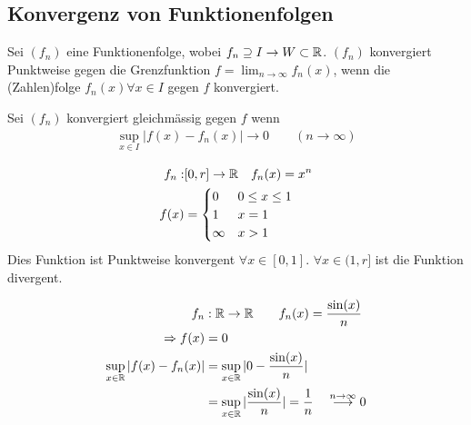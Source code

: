 \documentclass[a4paper]{article}
\begin{document}
	\subsection{Konvergenz von Funktionenfolgen}
	\begin{multicols}{2}
		\begin{fdef}
			Sei $(f_n)$  eine Funktionenfolge, wobei $f_n \supseteq I \rightarrow W \subset \mathbb{R}$. $(f_n)$ konvergiert Punktweise gegen die Grenzfunktion $f = \lim_{n \rightarrow \infty} f_n(x)$, wenn die (Zahlen)folge $f_n(x) \forall x \in I$ gegen $f$ konvergiert. 
		\end{fdef}
		\begin{fdef}
			Sei $(f_n)$ konvergiert gleichmässig gegen $f$ wenn
			\begin{align*}
				\sup_{x \in I} | f(x) - f_n(x) | \rightarrow 0 \qquad (n \rightarrow \infty)
			\end{align*}
		\end{fdef}
	\end{multicols}
	\begin{multicols}{2}
		\begin{fmerke}	
			\begin{align*}
				f_n: &[0,r] \rightarrow \mathbb{R} \quad f_n(x) = x^n \\
				f(x) &= \begin{cases}			
				        	0		& 0 \leq x \leq 1 \\
				        	1		& x = 1 \\
				         	\infty 	& x > 1
				        \end{cases}
			\end{align*}
			Dies Funktion ist Punktweise konvergent $\forall x \in [0,1]$. $\forall x \in (1,r]$ ist die Funktion divergent.
		\end{fmerke}
		

		\begin{fmerke}
			\begin{align*}
				f_n&: \mathbb{R} \rightarrow \mathbb{R} \qquad f_n(x) = \frac{\sin(x)}{n}\\
				\Rightarrow f(x) &= 0\\
				\sup_{x \in \mathbb{R}} | f(x) - f_n(x)| &= \sup_{x \in \mathbb{R}} | 0 - \frac{\sin(x)}{n}| \\
				&= \sup_{x \in \mathbb{R}} |\frac{\sin(x)}{n}| = \frac{1}{n} \quad 
				\stackrel{n \rightarrow \infty}{\longrightarrow} 0				
			\end{align*}
		\end{fmerke}
	\end{multicols}
\end{document}
